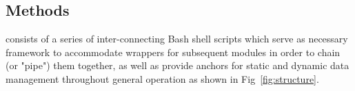 \begin{methods}
\section{Methods}

\app consists of a series of inter-connecting Bash shell scripts which serve as necessary framework to accommodate wrappers for subsequent modules in order to chain (or "pipe") them together, as well as provide anchors for static and dynamic data management throughout general operation as shown in Fig~\ref{fig:structure}. 







\end{methods}